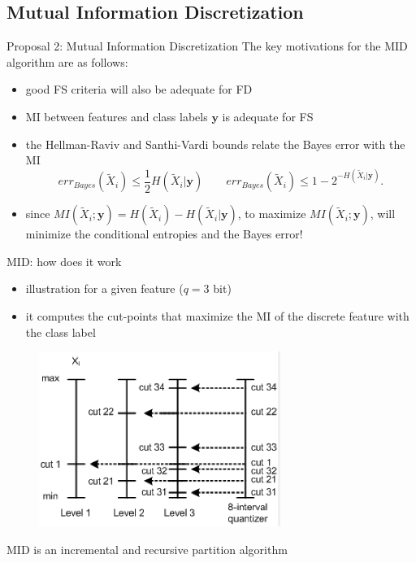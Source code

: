 \documentclass{beamer}
\begin{document}
\subsection[Mutual Information Discretization]{Mutual Information Discretization}
\begin{frame}{Proposal 2: Mutual Information Discretization}
The key motivations for the MID algorithm are as follows:
\begin{itemize}
	\vfill
	\item good FS criteria will also be adequate for FD

	\vfill
	\item MI between features and class labels $\mathbf{y}$ is adequate for FS

  \vfill
	\item the Hellman-Raviv and Santhi-Vardi bounds relate the Bayes error
	with the MI
	\begin{equation} \nonumber
	err_{Bayes}( \widetilde{X}_i ) \leq \frac{1}{2} H(\widetilde{X}_i| \mathbf{y} ) \qquad
	err_{Bayes}( \widetilde{X}_i ) \leq 1 - 2^{-H(\widetilde{X}_i| \mathbf{y})}.
	\end{equation}
	
  \vfill
	\item since $MI(\widetilde{X}_i;\mathbf{y}) = H(\widetilde{X}_i) - H(\widetilde{X}_i| \mathbf{y} )$, to 
	maximize $MI(\widetilde{X}_i;\mathbf{y})$, will minimize the conditional entropies and the Bayes error!
\end{itemize}
\end{frame}


\begin{frame}{MID: how does it work}
\begin{itemize}
	\item illustration for a given feature ($q=3$ bit)
	\item it computes the cut-points that maximize the MI of the discrete feature with the class label
\end{itemize} 
\begin{figure}
	\centering
	\includegraphics[width=0.7\textwidth]{fig2.png}
\end{figure}
{\small MID is an incremental and recursive partition algorithm}
\end{frame}
\end{document}
